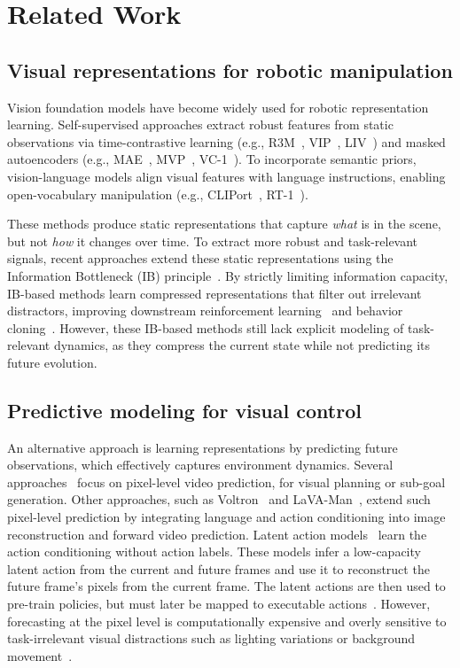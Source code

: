 \section{Related Work}
\label{sec:related}

\subsection{Visual representations for robotic manipulation}
Vision foundation models have become widely used for robotic representation learning. Self-supervised approaches extract robust features from static observations via time-contrastive learning (e.g., R3M~\cite{nair2022r3m}, VIP~\cite{ma2022vip}, LIV~\cite{ma2023liv}) and masked autoencoders (e.g., MAE~\cite{he2022masked}, MVP~\cite{radosavovic2023real}, VC-1~\cite{majumdar2023we}). To incorporate semantic priors, vision-language models align visual features with language instructions, enabling open-vocabulary manipulation (e.g., CLIPort~\cite{shridhar2022cliport}, RT-1~\cite{brohan2022rt}). 


These methods produce static representations that capture \textit{what} is in the scene, but not \textit{how} it changes over time. To extract more robust and task-relevant signals, recent approaches extend these static representations using the Information Bottleneck (IB) principle~\cite{tishby2000information}. By strictly limiting information capacity, IB-based methods learn compressed representations that filter out irrelevant distractors, improving downstream reinforcement learning~\cite{you2024multimodal} and behavior cloning~\cite{bai2025rethinking}. However, these IB-based methods still lack explicit modeling of task-relevant dynamics, as they compress the current state while not predicting its future evolution.

\subsection{Predictive modeling for visual control}
An alternative approach is learning representations by predicting future observations, which effectively captures environment dynamics. Several approaches~\cite{dasari2019robonet,du2023learning,black2023zero} focus on pixel-level video prediction, for visual planning or sub-goal generation. Other approaches, such as Voltron~\cite{karamcheti2023language} and LaVA-Man~\cite{zhu2025lava}, extend such pixel-level prediction by integrating language and action conditioning into image reconstruction and forward video prediction. Latent action models~\cite{schmidt2024learning, bruce2024genie,ye2025latent} learn the action conditioning without action labels. These models infer a low-capacity latent action from the current and future frames and use it to reconstruct the future frame's pixels from the current frame. The latent actions are then used to pre-train policies, but must later be mapped to executable actions~\cite{ye2025latent, agibot2025world}. However, forecasting at the pixel level is computationally expensive and overly sensitive to task-irrelevant visual distractions such as lighting variations or background movement~\cite{lecun2022path,bardes2024revisiting}.

